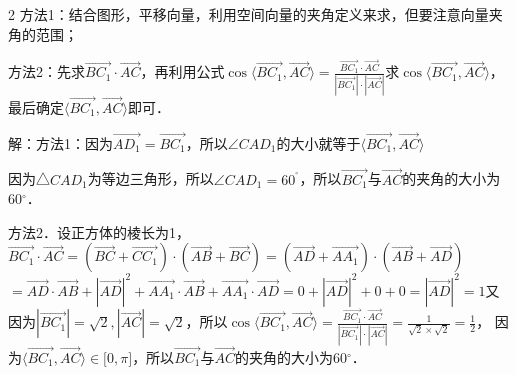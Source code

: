 \begin{multicols}{2}
\bindp [分析]方法1：结合图形，平移向量，利用空间向量的夹角定义来求，但要注意向量夹角的范围；

\bindp 方法2：先求\(\overrightarrow{BC_{1}} \cdot \overrightarrow{AC}\)，再利用公式\(\cos\langle \overrightarrow{BC_{1}},\overrightarrow{AC} \rangle = \frac{\overrightarrow{BC_{1}} \cdot \overrightarrow{AC}}{| \overrightarrow{BC_{1}} | \cdot | \overrightarrow{AC} |}\)求\(\cos\langle \overrightarrow{BC_{1}},\overrightarrow{AC} \rangle\)，最后确定\(\langle \overrightarrow{BC_{1}},\overrightarrow{AC} \rangle\)即可．

\bindp [详解]解：方法1：因为\(\overrightarrow{AD_{1}} = \overrightarrow{BC_{1}}\)，所以\(\angle CAD_{1}\)的大小就等于\(\langle \overrightarrow{BC_{1}},\overrightarrow{AC} \rangle\)

\bindp 因为△\(CAD_{1}\)为等边三角形，所以\(\angle CAD_{1} = 60^{{^\circ}}\)，所以\(\overrightarrow{BC_{1}}\)与\(\overrightarrow{AC}\)的夹角的大小为\(60{^\circ}\)．

\bindp 方法2．设正方体的棱长为1，\(\overrightarrow{BC_{1}} \cdot \overrightarrow{AC} = ( \overrightarrow{BC} + \overrightarrow{CC_{1}} ) \cdot ( \overrightarrow{AB} + \overrightarrow{BC} ) = ( \overrightarrow{AD} + \overrightarrow{AA_{1}} ) \cdot ( \overrightarrow{AB} + \overrightarrow{AD} )\)\(= \overrightarrow{AD} \cdot \overrightarrow{AB} + | \overrightarrow{AD} |^{2} + \overrightarrow{AA_{1}} \cdot \overrightarrow{AB} + \overrightarrow{AA_{1}} \cdot \overrightarrow{AD} = 0 + | \overrightarrow{AD} |^{2} + 0 + 0 = | \overrightarrow{AD} |^{2} = 1\)又因为\(| \overrightarrow{BC_{1}} | = \sqrt{2},| \overrightarrow{AC} | = \sqrt{2}\)，所以\(\cos\langle \overrightarrow{BC_{1}},\overrightarrow{AC} \rangle = \frac{\overrightarrow{BC_{1}} \cdot \overrightarrow{AC}}{| \overrightarrow{BC_{1}} | \cdot | \overrightarrow{AC} |} = \frac{1}{\sqrt{2} \times \sqrt{2}} = \frac{1}{2}\)，
因为\(\langle \overrightarrow{BC_{1}},\overrightarrow{AC} \rangle \in \lbrack 0,\pi\rbrack\)，所以\(\overrightarrow{BC_{1}}\)与\(\overrightarrow{AC}\)的夹角的大小为\(60{^\circ}\)．





\end{multicols}
